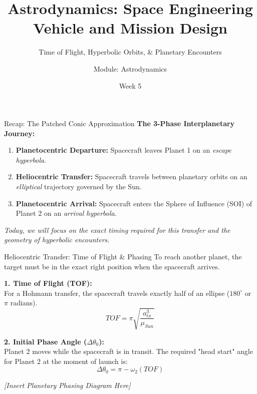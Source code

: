 \documentclass[11pt]{beamer}
\title[Interplanetary Trajectories II]{Astrodynamics: Space Engineering Vehicle and Mission Design}
\subtitle{Time of Flight, Hyperbolic Orbits, \& Planetary Encounters}
\author{Module: Astrodynamics}
\date{Week 5}
\begin{document}
\begin{frame}
    \titlepage
\end{frame}

\begin{frame}{Recap: The Patched Conic Approximation}
    \textbf{The 3-Phase Interplanetary Journey:}
    \begin{enumerate}
        \item \textbf{Planetocentric Departure:} Spacecraft leaves Planet 1 on an \textit{escape hyperbola}.
        \item \textbf{Heliocentric Transfer:} Spacecraft travels between planetary orbits on an \textit{elliptical} trajectory governed by the Sun.
        \item \textbf{Planetocentric Arrival:} Spacecraft enters the Sphere of Influence (SOI) of Planet 2 on an \textit{arrival hyperbola}.
    \end{enumerate}
    
    \vspace{0.3cm}
    \textit{Today, we will focus on the exact timing required for this transfer and the geometry of hyperbolic encounters.}
\end{frame}

\begin{frame}{Heliocentric Transfer: Time of Flight \& Phasing}
    To reach another planet, the target must be in the exact right position when the spacecraft arrives. 
    
    \vspace{0.2cm}
    \textbf{1. Time of Flight (TOF):} \\
    For a Hohmann transfer, the spacecraft travels exactly half of an ellipse ($180^\circ$ or $\pi$ radians).
    \begin{equation}
        TOF = \pi \sqrt{\frac{a_{tx}^3}{\mu_{Sun}}}
    \end{equation}

    \textbf{2. Initial Phase Angle ($\Delta \theta_0$):} \\
    Planet 2 moves while the spacecraft is in transit. The required "head start" angle for Planet 2 at the moment of launch is:
    \begin{equation}
        \Delta \theta_0 = \pi - \omega_2 (TOF)
    \end{equation}
    
    \begin{center}
        \textit{[Insert Planetary Phasing Diagram Here]}
    \end{center}
\end{frame}
\end{document}
